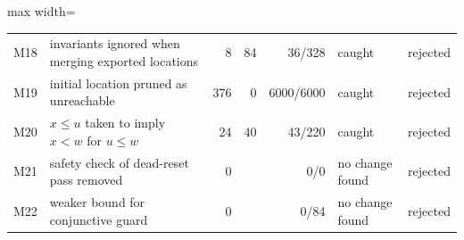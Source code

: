 \begin{adjustbox}{max width=\textwidth}
\begin{tabular}{@{}lp{}rrrp{}l@{}}
M18 & invariants ignored when merging exported locations & 8 & 84 & 36/328 & caught & rejected \\
M19 & initial location pruned as unreachable & 376 & 0 & 6000/6000 & caught & rejected \\
M20 & $x\le u$ taken to imply $x<w$ for $u\le w$ & 24 & 40 & 43/220 & caught & rejected \\
M21 & safety check of dead-reset pass removed & 0 & \textemdash{} & 0/0 & no change found & rejected \\
M22 & weaker bound for conjunctive guard & 0 & \textemdash{} & 0/84 & no change found & rejected \\
\bottomrule
\end{tabular}\end{adjustbox}
